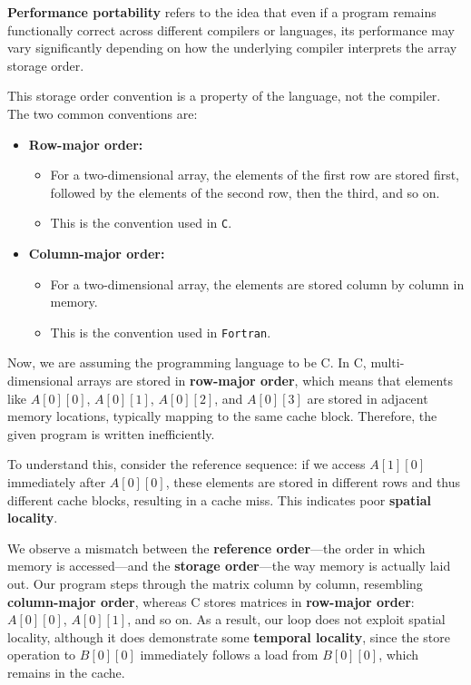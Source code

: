 \documentclass[12pt]{book}
\begin{document}
\textbf{Performance portability} refers to the idea that even if a program remains functionally correct across different compilers or languages, its performance may vary significantly depending on how the underlying compiler interprets the array storage order.

This storage order convention is a property of the language, not the compiler. The two common conventions are:

\begin{itemize}
    \item \textbf{Row-major order:}
    \begin{itemize}
        \item For a two-dimensional array, the elements of the first row are stored first, followed by the elements of the second row, then the third, and so on.
        \item This is the convention used in \texttt{C}.
    \end{itemize}
    
    \item \textbf{Column-major order:}
    \begin{itemize}
        \item For a two-dimensional array, the elements are stored column by column in memory.
        \item This is the convention used in \texttt{Fortran}.
    \end{itemize}
\end{itemize}
Now, we are assuming the programming language to be C. In C, multi-dimensional arrays are stored in \textbf{row-major order}, which means that elements like $A[0][0]$, $A[0][1]$, $A[0][2]$, and $A[0][3]$ are stored in adjacent memory locations, typically mapping to the same cache block. Therefore, the given program is written inefficiently. 

To understand this, consider the reference sequence: if we access $A[1][0]$ immediately after $A[0][0]$, these elements are stored in different rows and thus different cache blocks, resulting in a cache miss. This indicates poor \textbf{spatial locality}.

We observe a mismatch between the \textbf{reference order}—the order in which memory is accessed—and the \textbf{storage order}—the way memory is actually laid out. Our program steps through the matrix column by column, resembling \textbf{column-major order}, whereas C stores matrices in \textbf{row-major order}: $A[0][0]$, $A[0][1]$, and so on. As a result, our loop does not exploit spatial locality, although it does demonstrate some \textbf{temporal locality}, since the store operation to $B[0][0]$ immediately follows a load from $B[0][0]$, which remains in the cache.
\end{document}
